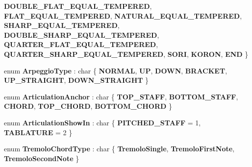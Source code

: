 \begin{DoxyCompactItemize}
{\bfseries D\+O\+U\+B\+L\+E\+\_\+\+F\+L\+A\+T\+\_\+\+E\+Q\+U\+A\+L\+\_\+\+T\+E\+M\+P\+E\+R\+ED}, 
{\bfseries F\+L\+A\+T\+\_\+\+E\+Q\+U\+A\+L\+\_\+\+T\+E\+M\+P\+E\+R\+ED}, 
{\bfseries N\+A\+T\+U\+R\+A\+L\+\_\+\+E\+Q\+U\+A\+L\+\_\+\+T\+E\+M\+P\+E\+R\+ED}, 
\newline
{\bfseries S\+H\+A\+R\+P\+\_\+\+E\+Q\+U\+A\+L\+\_\+\+T\+E\+M\+P\+E\+R\+ED}, 
{\bfseries D\+O\+U\+B\+L\+E\+\_\+\+S\+H\+A\+R\+P\+\_\+\+E\+Q\+U\+A\+L\+\_\+\+T\+E\+M\+P\+E\+R\+ED}, 
{\bfseries Q\+U\+A\+R\+T\+E\+R\+\_\+\+F\+L\+A\+T\+\_\+\+E\+Q\+U\+A\+L\+\_\+\+T\+E\+M\+P\+E\+R\+ED}, 
{\bfseries Q\+U\+A\+R\+T\+E\+R\+\_\+\+S\+H\+A\+R\+P\+\_\+\+E\+Q\+U\+A\+L\+\_\+\+T\+E\+M\+P\+E\+R\+ED}, 
\newline
{\bfseries S\+O\+RI}, 
{\bfseries K\+O\+R\+ON}, 
{\bfseries E\+ND}
 \}
\item 
\mbox{\label{namespace_ms_a42f3e7a3ca5769211631801e03dfe1c8}} 
enum {\bfseries Arpeggio\+Type} \+: char \{ \newline
{\bfseries N\+O\+R\+M\+AL}, 
{\bfseries UP}, 
{\bfseries D\+O\+WN}, 
{\bfseries B\+R\+A\+C\+K\+ET}, 
\newline
{\bfseries U\+P\+\_\+\+S\+T\+R\+A\+I\+G\+HT}, 
{\bfseries D\+O\+W\+N\+\_\+\+S\+T\+R\+A\+I\+G\+HT}
 \}
\item 
\mbox{\label{namespace_ms_a2d43ff9c26edae64d956fd7a345356b4}} 
enum {\bfseries Articulation\+Anchor} \+: char \{ \newline
{\bfseries T\+O\+P\+\_\+\+S\+T\+A\+FF}, 
{\bfseries B\+O\+T\+T\+O\+M\+\_\+\+S\+T\+A\+FF}, 
{\bfseries C\+H\+O\+RD}, 
{\bfseries T\+O\+P\+\_\+\+C\+H\+O\+RD}, 
\newline
{\bfseries B\+O\+T\+T\+O\+M\+\_\+\+C\+H\+O\+RD}
 \}
\item 
\mbox{\label{namespace_ms_ae609f4496ada1b4441d8034adda5fd1d}} 
enum {\bfseries Articulation\+Show\+In} \+: char \{ {\bfseries P\+I\+T\+C\+H\+E\+D\+\_\+\+S\+T\+A\+FF} = 1, 
{\bfseries T\+A\+B\+L\+A\+T\+U\+RE} = 2
 \}
\item 
\mbox{\label{namespace_ms_a166cb7869869e9a2da70f6e7807b3f36}} 
enum {\bfseries Tremolo\+Chord\+Type} \+: char \{ {\bfseries Tremolo\+Single}, 
{\bfseries Tremolo\+First\+Note}, 
{\bfseries Tremolo\+Second\+Note}
 \}
\item 
\mbox{\label{namespace_ms_a3ca11c21f2fe66a8c8efc1bf0d75ccf2}} 

\end{DoxyCompactItemize}
